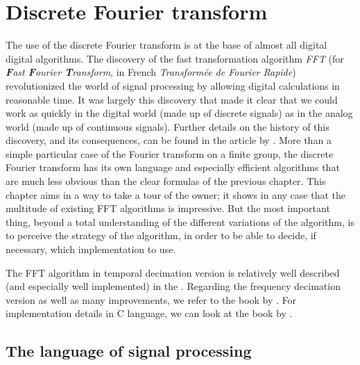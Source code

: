 \chapter{Discrete Fourier transform}
\label{chap-tfd} 
 
 
The use of the discrete Fourier transform is at the base of almost all digital digital algorithms. The discovery of the fast transformation algorithm \textit{FFT} (for \textit{\textbf{F}ast \textbf{F}ourier \textbf{T}ransform}, in French \textit{Transformée de Fourier Rapide}) revolutionized the world of signal processing by allowing digital calculations in reasonable time. It was largely this discovery that made it clear that we could work as quickly in the digital world (made up of discrete signals) as in the analog world (made up of continuous signals). Further details on the history of this discovery, and its consequences, can be found in the article by  \cite{rockmore-fft}. More than a simple particular case of the Fourier transform on a finite group, the discrete Fourier transform has its own language and especially efficient algorithms that are much less obvious than the clear formulas of the previous chapter. This chapter aims in a way to take a tour of the owner; it shows in any case that the multitude of existing FFT algorithms is impressive. But the most important thing, beyond a total understanding of the different variations of the algorithm, is to perceive the strategy of the algorithm, in order to be able to decide, if necessary, which implementation to use.
 
The FFT algorithm in temporal decimation version is relatively well described (and especially well implemented) in the  \cite{nr}. Regarding the frequency decimation version as well as many improvements, we refer to the book by  \cite{brigham-fft}. For implementation details in C language, we can look at the book by  \cite{arndt-algo-programmers}.
 
\section{The language of signal processing}
\label{sect1-language-processing-signal} 
 
